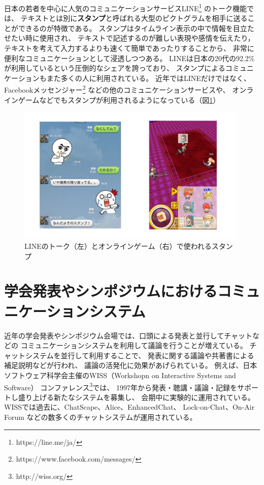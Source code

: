 日本の若者を中心に人気のコミュニケーションサービスLINE\footnote{\textsf{https://line.me/ja/}}
のトーク機能では、
テキストとは別に{\bf スタンプ}と呼ばれる大型のピクトグラムを相手に送ることができるのが特徴である。
スタンプはタイムライン表示の中で情報を目立たせたい時に使用され、
テキストで記述するのが難しい表現や感情を伝えたり，
テキストを考えて入力するよりも速くて簡単であったりすることから、
非常に便利なコミュニケーションとして浸透しつつある。
LINEは日本の20代の92.2\%が利用しているという圧倒的なシェアを誇っており\cite{soumu27}、
スタンプによるコミュニケーションもまた多くの人に利用されている\cite{40020496489}。
近年ではLINEだけではなく、Facebookメッセンジャー\footnote{\textsf{https://www.facebook.com/messages/}}
などの他のコミュニケーションサービスや、
オンラインゲームなどでもスタンプが利用されるようになっている（図\ref{gamestamp}）

\begin{figure}[H]
\centering
\includegraphics[width=11cm]{images/gamestamp.png}
\caption{LINEのトーク（左）とオンラインゲーム（右）で使われるスタンプ}
\label{gamestamp}
\end{figure}


\section{学会発表やシンポジウムにおけるコミュニケーションシステム}
\label{chap:background_2}

近年の学会発表やシンポジウム会場では、口頭による発表と並行してチャットなどの
コミュニケーションシステムを利用して議論を行うことが増えている\cite{goto2012}。
チャットシステムを並行して利用することで、
発表に関する議論や共著書による補足説明などが行われ、
議論の活発化に効果があげられている\cite{40000002634}。
例えば、日本ソフトウェア科学会主催のWISS（Workshopn on Interactive Systems and Software）
コンファレンス\footnote{\textsf{http://wiss.org/}}では、
1997年から発表・聴講・議論・記録をサポートし盛り上げる新たなシステムを募集し、
会期中に実験的に運用されている\cite{wiss_challenge}。
WISSでは過去に、ChatScape\cite{308}、Alice\cite{fukui}、EnhancedChat\cite{110002711453}、
Lock-on-Chat\cite{nishida2006}、On-Air Forum\cite{nishida2011}
などの数多くのチャットシステムが運用されている。


